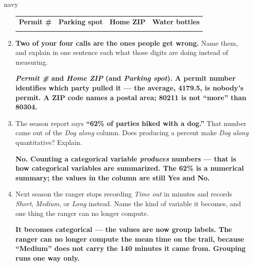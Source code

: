 \documentclass[10pt]{article}
\newcommand{\answerspace}[2]{\par\nopagebreak\noindent\begin{minipage}[t][#1][t]{\linewidth}%
  \color{keyred}\bfseries #2\end{minipage}\par}
\begin{document}
\begin{scenariobox}{navy}
\begin{enumerate}[label=\textbf{\alph*.}, leftmargin=1.8em, itemsep=5pt]
        \vspace{3pt}
        \renewcommand{\arraystretch}{1.3}
        \begin{tabularx}{\linewidth}{@{} Y Y Y Y @{}}
        \textbf{Permit \#} & \textbf{Parking spot} & \textbf{Home ZIP} & \textbf{Water bottles} \\
         &  &  &  \\
        \end{tabularx}
  \item \textbf{Two of your four calls are the ones people get wrong.} Name them, and explain
        in one sentence each what those digits are doing instead of measuring.
        \answerspace{1.8cm}{\emph{Permit \#} and \emph{Home ZIP} (and \emph{Parking spot}).
        A permit number identifies which party pulled it --- the average, 4179.5, is nobody's
        permit. A ZIP code names a postal area; 80211 is not ``more'' than 80304.}
  \item The season report says \textbf{``62\% of parties hiked with a dog.''} That number came
        out of the \emph{Dog along} column. Does producing a percent make \emph{Dog along}
        quantitative? Explain.
        \answerspace{1.8cm}{No. Counting a categorical variable \emph{produces} numbers --- that
        is how categorical variables are summarized. The 62\% is a numerical summary; the values
        in the column are still Yes and No.}
  \item Next season the ranger stops recording \emph{Time out} in minutes and records
        \emph{Short}, \emph{Medium}, or \emph{Long} instead. Name the kind of variable it
        becomes, and one thing the ranger can no longer compute.
        \answerspace{1.6cm}{It becomes \textbf{categorical} --- the values are now group labels.
        The ranger can no longer compute the mean time on the trail, because ``Medium'' does not
        carry the 140 minutes it came from. Grouping runs one way only.}
\end{enumerate}
\end{scenariobox}

\vspace{0.07in}
\end{document}
